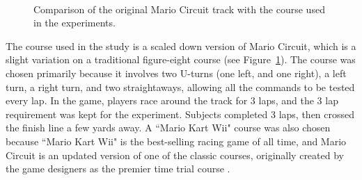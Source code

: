 \documentclass[12pt, letterpaper]{report}
\begin{document}
\begin{figure}
	\centering
	~
	\caption{Comparison of the original Mario Circuit track with the course used in the experiments.}
	\label{mario_circuit}
\end{figure}

The course used in the study is a scaled down version of Mario Circuit, which is a slight variation on a traditional figure-eight course (see Figure~\ref{mario_circuit}). The course was chosen primarily because it involves two U-turns (one left, and one right), a left turn, a right turn, and two straightaways, allowing all the commands to be tested every lap. In the game, players race around the track for 3 laps, and the 3 lap requirement was kept for the experiment. Subjects completed 3 laps, then crossed the finish line a few yards away. A ``Mario Kart Wii" course was also chosen because ``Mario Kart Wii" is the  best-selling racing game of all time, and Mario Circuit is an updated version of one of the classic courses, originally created by the game designers as the premier time trial course \cite{MarioCircuit}. 
\end{document}

